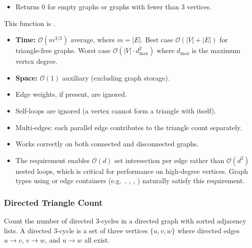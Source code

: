 \begin{itemdescr}
\begin{itemize}
                  \item Returns 0 for empty graphs or graphs with fewer than 3 vertices.
            \end{itemize}
      \pnum\throws This function is .
      \pnum\complexity
            \begin{itemize}
                  \item \textbf{Time:} $\mathcal{O}(m^{3/2})$ average, where $m = |E|$. Best case
                        $\mathcal{O}(|V|+|E|)$ for triangle-free graphs. Worst case
                        $\mathcal{O}(|V| \cdot d_{\max}^2)$ where $d_{\max}$ is the maximum vertex degree.
                  \item \textbf{Space:} $\mathcal{O}(1)$ auxiliary (excluding graph storage).
            \end{itemize}
      \pnum\remarks 
            \begin{itemize}
                  \item Edge weights, if present, are ignored.
                  \item Self-loops are ignored (a vertex cannot form a triangle with itself).
                  \item Multi-edges: each parallel edge contributes to the triangle count separately.
                  \item Works correctly on both connected and disconnected graphs.
                  \item The  requirement enables $\mathcal{O}(d)$ set intersection
                        per edge rather than $\mathcal{O}(d^2)$ nested loops, which is critical for
                        performance on high-degree vertices. Graph types using  or
                         edge containers (e.g.\ , , ,
                        ) naturally satisfy this requirement.
            \end{itemize}
\end{itemdescr}

\subsubsection{Directed Triangle Count}

Count the number of directed 3-cycles in a directed graph with sorted adjacency lists.
A directed 3-cycle is a set of three vertices $\{u, v, w\}$ where directed edges
$u \rightarrow v$, $v \rightarrow w$, and $u \rightarrow w$ all exist.

